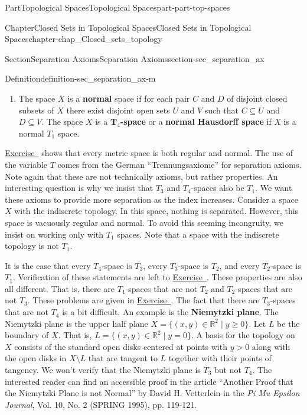 \documentclass[oneside,10pt,]{book}
\newcommand{\xreffont}{\relax}
\newcommand{\terminology}[1]{\textbf{#1}}
\newcommand{\pubtitle}[1]{\textsl{#1}}
\numberwithin{equation}{chapter}
\newcommand{\R}{\mathbb{R}}
\newcommand{\gt}{>}
\begin{document}
\begin{partptx}{Part}{Topological Spaces}{}{Topological Spaces}{}{}{part-part-top-spaces}
\begin{chapterptx}{Chapter}{Closed Sets in Topological Spaces}{}{Closed Sets in Topological Spaces}{}{}{chapter-chap_Closed_sets_topology}
\begin{sectionptx}{Section}{Separation Axioms}{}{Separation Axioms}{}{}{section-sec_separation_ax}
\begin{definition}{Definition}{}{definition-sec_separation_ax-m}
\begin{enumerate}
\item{}The space \(X\) is a \terminology{normal} space if for each pair \(C\) and \(D\) of disjoint closed subsets of \(X\) there exist disjoint open sets \(U\) and \(V\) such that \(C \subseteq U\) and \(D \subseteq V\). The space \(X\) is a \terminology{T\(_4\)-space} or a \terminology{normal Hausdorff space} if \(X\) is a normal \(T_1\) space.%
\end{enumerate}
%
\end{definition}
\hyperlink{exercise-ex_Metric_space_regular}{Exercise~{\xreffont 16}} shows that every metric space is both regular and normal. The use of the variable \(T\) comes from the German ``Trennungsaxiome'' for separation axioms. Note again that these are not technically axioms, but rather properties. An interesting question is why we insist that \(T_3\) and \(T_4\)-spaces also be \(T_1\). We want these axioms to provide more separation as the index increases. Consider a space \(X\) with the indiscrete topology. In this space, nothing is separated. However, this space is vacuously regular and normal. To avoid this seeming incongruity, we insist on working only with \(T_1\) spaces. Note that a space with the indiscrete topology is not \(T_1\).%
\par
It is the case that every \(T_4\)-space is \(T_3\), every \(T_3\)-space is \(T_2\), and every \(T_2\)-space is \(T_1\). Verification of these statements are left to \hyperlink{exercise-ex_T_1_2_3}{Exercise~{\xreffont 18}}. These properties are also all different. That is, there are \(T_1\)-spaces that are not \(T_2\) and \(T_2\)-spaces that are not \(T_3\). These problems are given in \hyperlink{exercise-ex_not_T_1_2_3}{Exercise~{\xreffont 19}}. The fact that there are \(T_3\)-spaces that are not \(T_4\) is a bit difficult. An example is the \terminology{Niemytzki plane}. The Niemytzki plane is the upper half plane \(X = \{(x,y) \in \R^2 \mid y \geq 0\}\). Let \(L\) be the boundary of \(X\). That is, \(L = \{(x,y) \in \R^2 \mid y = 0\}\). A basis for the topology on \(X\) consists of the standard open disks centered at points with \(y \gt 0\) along with the open disks in \(X \setminus L\) that are tangent to \(L\) together with their points of tangency. We won't verify that the Niemytzki plane is \(T_3\) but not \(T_4\). The interested reader can find an accessible proof in the article ``Another Proof that the Niemytzki Plane is not Normal'' by David H. Vetterlein in the \pubtitle{Pi Mu Epsilon Journal}, Vol. 10, No. 2 (SPRING 1995), pp. 119-121.%
\end{sectionptx}

\end{chapterptx}
\end{partptx}
\end{document}
